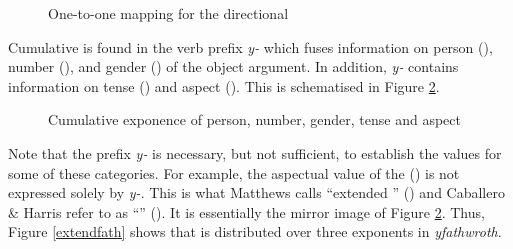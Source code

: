\begin{figure}
\begin{center}
\end{center}
\caption{One-to-one mapping for the directional}
\label{one-to-one}
\end{figure}%

Cumulative  is found in the verb prefix \emph{y-} which fuses information on person (\Third), number (\Sg), and gender (\Masc) of the object argument. In addition, \emph{y-} contains information on tense (\Nonpast) and aspect (\Ipfv{}). This is schematised in Figure \ref{cumulfath}.

\begin{figure}
\begin{center}
\end{center}
\caption{Cumulative exponence of person, number, gender, tense and aspect}
\label{cumulfath}
\end{figure}%

Note that the prefix \emph{y-} is necessary, but not sufficient, to establish the values for some of these categories. For example, the aspectual value of the  (\Ipfv) is not expressed solely by \emph{y-}. This is what Matthews calls ``extended '' (\citeyear[147-149]{Matthews:1979vm}) and Caballero \& Harris refer to as ``'' (\citeyear[163]{Caballero:2012vr}). It is essentially the mirror image of Figure \ref{cumulfath}. Thus, Figure \ref{extendfath} shows that  is distributed over three exponents in \emph{yfathwroth}.


